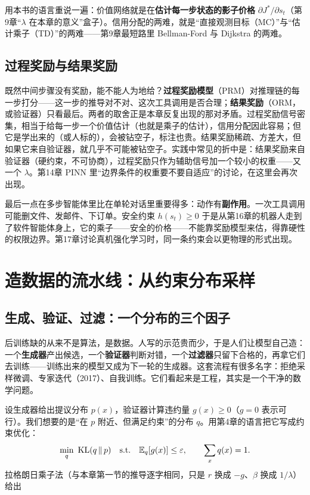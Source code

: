 用本书的语言重说一遍：价值网络就是在\textbf{估计每一步状态的影子价格} $\partial J^*/\partial s_t$（第9章“$\lambda$ 在本章的意义”盒子）。信用分配的两难，就是“直接观测目标（MC）”与“估计乘子（TD）”的两难——第9章最短路里 Bellman-Ford 与 Dijkstra 的两难。

\subsection{过程奖励与结果奖励}

既然中间步骤没有奖励，能不能人为地给？\textbf{过程奖励模型}（PRM）对推理链的每一步打分——这一步的推导对不对、这次工具调用是否合理；\textbf{结果奖励}（ORM，或验证器）只看最后。两者的取舍正是本章反复出现的那对矛盾。过程奖励信号密集，相当于给每一步一个价值估计（也就是乘子的估计），信用分配因此容易；但它是学出来的（或人标的），会被钻空子，标注也贵。结果奖励稀疏、方差大，但如果它来自验证器，就几乎不可能被钻空子。实践中常见的折中是：结果奖励来自验证器（硬约束，不可协商），过程奖励只作为辅助信号加一个较小的权重——又一个 $\lambda$。第14章 PINN 里“边界条件的权重要不要自适应”的讨论，在这里会再次出现。

最后一点在多步智能体里比在单轮对话里重要得多：动作有\textbf{副作用}。一次工具调用可能删文件、发邮件、下订单。安全约束 $h(s_t) \ge 0$ 于是从第16章的机器人走到了软件智能体身上，它的乘子——安全的价格——不能靠奖励模型来估，得靠硬性的权限边界。第17章讨论真机强化学习时，同一条约束会以更物理的形式出现。

\section{造数据的流水线：从约束分布采样}

\subsection{生成、验证、过滤：一个分布的三个因子}

后训练缺的从来不是算法，是数据。人写的示范贵而少，于是人们让模型自己造：一个\textbf{生成器}产出候选，一个\textbf{验证器}判断对错，一个\textbf{过滤器}只留下合格的，再拿它们去训练——训练出来的模型又成为下一轮的生成器。这套流程有很多名字：拒绝采样微调、专家迭代（2017）、自我训练。它们看起来是工程，其实是一个干净的数学问题。

设生成器给出提议分布 $p(x)$，验证器计算违约量 $g(x) \ge 0$（$g = 0$ 表示可行）。我们想要的是“在 $p$ 附近、但满足约束”的分布 $q$。用第4章的语言把它写成约束优化：
\begin{equation}
    \min_q\ \mathrm{KL}(q\,\|\,p) \quad \text{s.t.} \quad \mathbb{E}_q[g(x)] \le \varepsilon, \qquad \sum_x q(x) = 1.
\end{equation}
拉格朗日乘子法（与本章第一节的推导逐字相同，只是 $r$ 换成 $-g$、$\beta$ 换成 $1/\lambda$）给出

